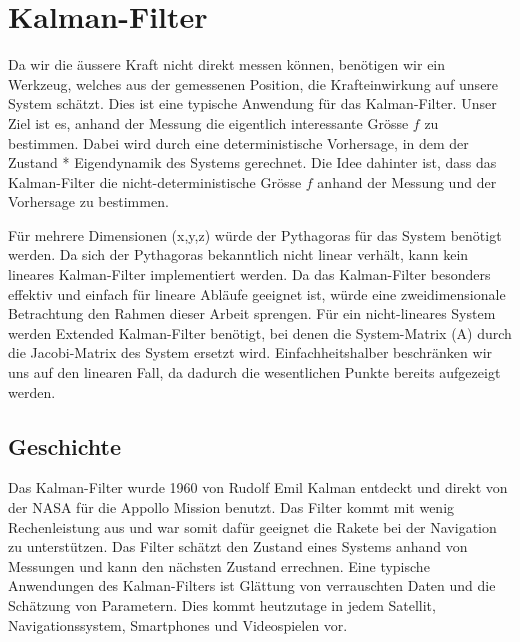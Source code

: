 %
%
%
%
%




\section{Kalman-Filter}
Da wir die äussere Kraft nicht direkt messen können, benötigen wir ein Werkzeug, welches aus der gemessenen Position, die Krafteinwirkung auf unsere System schätzt. 
Dies ist eine typische Anwendung für das Kalman-Filter.
Unser Ziel ist es, anhand der Messung die eigentlich interessante Grösse $f$ zu bestimmen. 
Dabei wird durch eine deterministische Vorhersage, in dem der Zustand * Eigendynamik des Systems gerechnet. 
Die Idee dahinter ist, dass das Kalman-Filter die nicht-deterministische Grösse $f$ anhand der Messung und der Vorhersage zu bestimmen.

Für mehrere Dimensionen (x,y,z) würde der Pythagoras für das System benötigt werden.
Da sich der Pythagoras bekanntlich nicht linear verhält, kann kein lineares Kalman-Filter implementiert werden. 
Da das Kalman-Filter besonders effektiv und einfach für lineare Abläufe geeignet ist, würde eine zweidimensionale Betrachtung den Rahmen dieser Arbeit sprengen. 
Für ein nicht-lineares System werden Extended Kalman-Filter benötigt, bei denen die System-Matrix (A) durch die Jacobi-Matrix des System ersetzt wird.
Einfachheitshalber beschränken wir uns auf den linearen Fall, da dadurch die wesentlichen Punkte bereits aufgezeigt werden. 

\subsection{Geschichte}
Das Kalman-Filter wurde 1960 von Rudolf Emil Kalman entdeckt und direkt von der NASA für die Appollo Mission benutzt.
Das Filter kommt mit wenig Rechenleistung aus und war somit dafür geeignet die Rakete bei der Navigation zu unterstützen. 
Das Filter schätzt den Zustand eines Systems anhand von Messungen und kann den nächsten Zustand errechnen. Eine typische Anwendungen des Kalman-Filters ist Glättung von verrauschten Daten und die Schätzung von Parametern. Dies kommt heutzutage in jedem Satellit, Navigationssystem, Smartphones und Videospielen vor.

